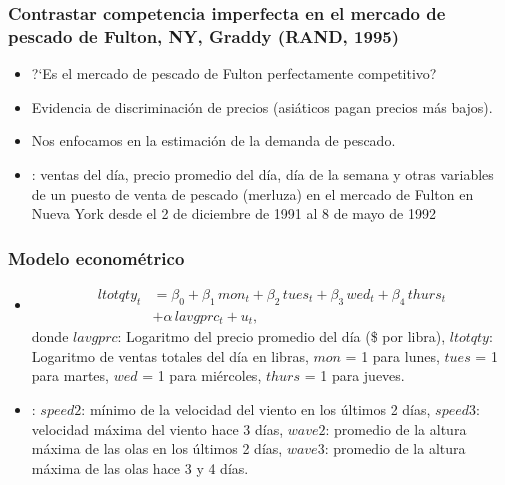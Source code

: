 \documentclass[t, compress, spanish, aspectratio=169]{beamer}
\newcommand{\term}[1]{\structure{\textbf{#1}}} %
\begin{document}
\begin{frame}
    \frametitle{Contrastar competencia imperfecta en el mercado de pescado de Fulton, NY, Graddy (RAND, 1995)}
    \begin{itemize}
        \item  ?`Es el mercado de pescado de Fulton perfectamente competitivo?
        \item  Evidencia de discriminaci\'on de precios (asi\'aticos pagan precios m\'as bajos).
        \item  Nos enfocamos en la estimaci\'on de la demanda de pescado.
        \item  \term{Datos}: ventas del d\'ia, precio promedio del d\'ia, d\'ia de la semana y otras variables de un puesto de venta de pescado (merluza) en el mercado de Fulton en Nueva York desde el 2 de diciembre de 1991 al 8 de mayo de 1992
        
    \end{itemize}
\end{frame}
\begin{frame}
    \frametitle{Modelo econom\'etrico}
    \begin{itemize}
        \item  []
        \begin{align*}
        ltotqty_t&= \beta_0+\beta_1\, mon_t+\beta_2 \,tues_t+\beta_3\, wed_t+\beta_4 \,thurs_t\\
        &+\alpha \, lavgprc_t +u_t,
        \end{align*}
        donde $lavgprc$: Logaritmo del precio promedio del d\'ia (\$ por libra), $ltotqty$: Logaritmo de ventas totales del d\'ia en libras, $mon$ = 1 para lunes, $tues$ = 1 para martes, $wed$ = 1 para mi\'ercoles, $thurs$ = 1 para jueves.
        \item \term{Instrumentos}: $speed2$: m\'inimo de la velocidad del viento en los \'ultimos 2 d\'ias, $speed3$: velocidad m\'axima del viento hace 3 d\'ias, $wave2$: promedio de la altura m\'axima de las olas en los \'ultimos 2 d\'ias, $wave3$: promedio de la altura m\'axima de las olas hace 3 y 4 d\'ias.
    \end{itemize}
\end{frame}
\end{document}
